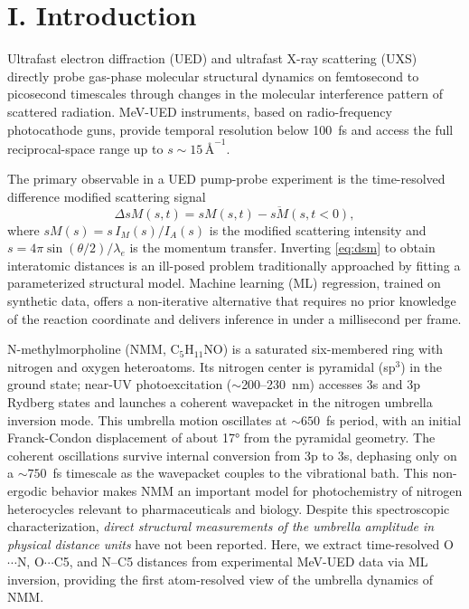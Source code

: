 \documentclass[12pt]{article}
\newcommand{\dsm}{\Delta sM}
\newcommand{\anginv}{\,\text{\AA}^{-1}}
\begin{document}
\section*{I.\; Introduction}

\noindent
Ultrafast electron diffraction (UED) and ultrafast X-ray scattering (UXS)
directly probe gas-phase molecular structural dynamics on femtosecond to
picosecond timescales through changes in the molecular interference
pattern of scattered radiation.\cite{Zewail2000,Yang2018,Ihee2001,Minitti2015}
MeV-UED instruments, based on radio-frequency photocathode guns, provide
temporal resolution below 100~fs and access the full reciprocal-space
range up to $s \sim 15\anginv$.\cite{Qi2020}

The primary observable in a UED pump-probe experiment is the
time-resolved difference modified scattering signal
\begin{equation}
  \dsm(s,t) = sM(s,t) - \overline{sM}(s,t<0),
  \label{eq:dsm}
\end{equation}
where $sM(s) = s\,I_M(s)/I_A(s)$ is the modified scattering intensity
and $s = 4\pi\sin(\theta/2)/\lambda_e$ is the momentum transfer.
Inverting \eqref{eq:dsm} to obtain interatomic distances is an ill-posed
problem traditionally approached by fitting a parameterized structural
model.\cite{Centurion2022} Machine learning (ML) regression, trained on
synthetic data, offers a non-iterative alternative that requires no prior
knowledge of the reaction coordinate and delivers inference in under a
millisecond per frame.\cite{Kirrander2021}

N-methylmorpholine (NMM, C$_5$H$_{11}$NO) is a saturated six-membered
ring with nitrogen and oxygen heteroatoms. Its nitrogen center is
pyramidal (sp$^3$) in the ground state; near-UV photoexcitation
($\sim$200--230~nm) accesses 3s and 3p Rydberg states and launches a
coherent wavepacket in the nitrogen umbrella inversion mode.\cite{Zhang2017}
This umbrella motion oscillates at $\sim 650$~fs period, with an initial
Franck-Condon displacement of about 17° from the pyramidal
geometry.\cite{Zhang2017} The coherent oscillations survive internal
conversion from 3p to 3s,\cite{Beedle2017} dephasing only on a
$\sim 750$~fs timescale as the wavepacket couples to the vibrational
bath.\cite{Zhang2017} This non-ergodic behavior makes NMM an important
model for photochemistry of nitrogen heterocycles relevant to
pharmaceuticals and biology.\cite{Nix2006}
Despite this spectroscopic characterization, \emph{direct structural
measurements of the umbrella amplitude in physical distance units} have
not been reported. Here, we extract time-resolved O$\cdots$N,
O$\cdots$C5, and N--C5 distances from experimental MeV-UED data via ML
inversion, providing the first atom-resolved view of the umbrella
dynamics of NMM.
\end{document}

